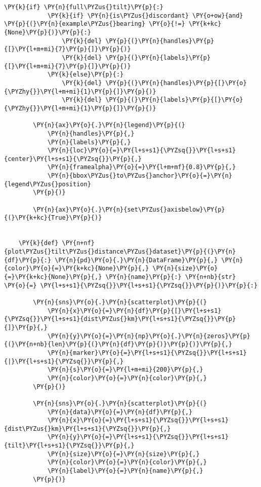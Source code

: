\begin{tcolorbox}[breakable, size=fbox, boxrule=1pt, pad at break*=1mm,colback=cellbackground, colframe=cellborder]
\begin{Verbatim}[commandchars=\\\{\}]
        \PY{k}{if} \PY{n}{full\PYZus{}tilt}\PY{p}{:}
            \PY{k}{if} \PY{n}{is\PYZus{}discordant} \PY{o+ow}{and} \PY{p}{(}\PY{n}{example\PYZus{}bearing} \PY{o}{!=} \PY{k+kc}{None}\PY{p}{)}\PY{p}{:}
                \PY{k}{del} \PY{p}{(}\PY{n}{handles}\PY{p}{[}\PY{l+m+mi}{7}\PY{p}{]}\PY{p}{)}
                \PY{k}{del} \PY{p}{(}\PY{n}{labels}\PY{p}{[}\PY{l+m+mi}{7}\PY{p}{]}\PY{p}{)}
            \PY{k}{else}\PY{p}{:}
                \PY{k}{del} \PY{p}{(}\PY{n}{handles}\PY{p}{[}\PY{o}{\PYZhy{}}\PY{l+m+mi}{1}\PY{p}{]}\PY{p}{)}
                \PY{k}{del} \PY{p}{(}\PY{n}{labels}\PY{p}{[}\PY{o}{\PYZhy{}}\PY{l+m+mi}{1}\PY{p}{]}\PY{p}{)}
    
        \PY{n}{ax}\PY{o}{.}\PY{n}{legend}\PY{p}{(}
            \PY{n}{handles}\PY{p}{,}
            \PY{n}{labels}\PY{p}{,}
            \PY{n}{loc}\PY{o}{=}\PY{l+s+s1}{\PYZsq{}}\PY{l+s+s1}{center}\PY{l+s+s1}{\PYZsq{}}\PY{p}{,}
            \PY{n}{framealpha}\PY{o}{=}\PY{l+m+mf}{0.8}\PY{p}{,}
            \PY{n}{bbox\PYZus{}to\PYZus{}anchor}\PY{o}{=}\PY{n}{legend\PYZus{}position}
        \PY{p}{)}
    
        \PY{n}{ax}\PY{o}{.}\PY{n}{set\PYZus{}axisbelow}\PY{p}{(}\PY{k+kc}{True}\PY{p}{)}
    
    
    \PY{k}{def} \PY{n+nf}{plot\PYZus{}tilt\PYZus{}distance\PYZus{}dataset}\PY{p}{(}\PY{n}{df}\PY{p}{:} \PY{n}{pd}\PY{o}{.}\PY{n}{DataFrame}\PY{p}{,} \PY{n}{color}\PY{o}{=}\PY{k+kc}{None}\PY{p}{,} \PY{n}{size}\PY{o}{=}\PY{k+kc}{None}\PY{p}{,} \PY{n}{name}\PY{p}{:} \PY{n+nb}{str} \PY{o}{=} \PY{l+s+s1}{\PYZsq{}}\PY{l+s+s1}{\PYZsq{}}\PY{p}{)}\PY{p}{:}
    
        \PY{n}{sns}\PY{o}{.}\PY{n}{scatterplot}\PY{p}{(}
            \PY{n}{x}\PY{o}{=}\PY{n}{df}\PY{p}{[}\PY{l+s+s1}{\PYZsq{}}\PY{l+s+s1}{dist\PYZus{}km}\PY{l+s+s1}{\PYZsq{}}\PY{p}{]}\PY{p}{,}
            \PY{n}{y}\PY{o}{=}\PY{n}{np}\PY{o}{.}\PY{n}{zeros}\PY{p}{(}\PY{n+nb}{len}\PY{p}{(}\PY{n}{df}\PY{p}{)}\PY{p}{)}\PY{p}{,}
            \PY{n}{marker}\PY{o}{=}\PY{l+s+s1}{\PYZsq{}}\PY{l+s+s1}{|}\PY{l+s+s1}{\PYZsq{}}\PY{p}{,}
            \PY{n}{s}\PY{o}{=}\PY{l+m+mi}{200}\PY{p}{,}
            \PY{n}{color}\PY{o}{=}\PY{n}{color}\PY{p}{,}
        \PY{p}{)}
    
        \PY{n}{sns}\PY{o}{.}\PY{n}{scatterplot}\PY{p}{(}
            \PY{n}{data}\PY{o}{=}\PY{n}{df}\PY{p}{,}
            \PY{n}{x}\PY{o}{=}\PY{l+s+s1}{\PYZsq{}}\PY{l+s+s1}{dist\PYZus{}km}\PY{l+s+s1}{\PYZsq{}}\PY{p}{,}
            \PY{n}{y}\PY{o}{=}\PY{l+s+s1}{\PYZsq{}}\PY{l+s+s1}{tilt}\PY{l+s+s1}{\PYZsq{}}\PY{p}{,}
            \PY{n}{size}\PY{o}{=}\PY{n}{size}\PY{p}{,}
            \PY{n}{color}\PY{o}{=}\PY{n}{color}\PY{p}{,}
            \PY{n}{label}\PY{o}{=}\PY{n}{name}\PY{p}{,}
        \PY{p}{)}
    

\end{Verbatim}
\end{tcolorbox}
